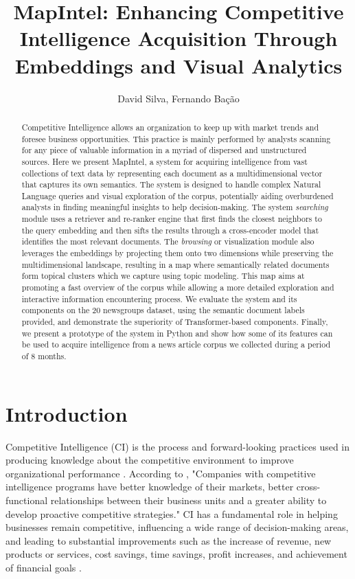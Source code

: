 \documentclass[a4paper]{article}
\title{MapIntel: Enhancing Competitive Intelligence Acquisition Through Embeddings and Visual Analytics}
\author{David Silva, Fernando Bação}
\date{}
\begin{document}
 
\maketitle

\begin{abstract}
Competitive Intelligence allows an organization to keep up with market trends and foresee business opportunities. This practice is mainly performed by analysts scanning for any piece of valuable information in a myriad of dispersed and unstructured sources. Here we present MapIntel, a system for acquiring intelligence from vast collections of text data by representing each document as a multidimensional vector that captures its own semantics. The system is designed to handle complex Natural Language queries and visual exploration of the corpus, potentially aiding overburdened analysts in finding meaningful insights to help decision-making. The system \emph{searching} module uses a retriever and re-ranker engine that first finds the closest neighbors to the query embedding and then sifts the results through a cross-encoder model that identifies the most relevant documents. The \emph{browsing} or visualization module also leverages the embeddings by projecting them onto two dimensions while preserving the multidimensional landscape, resulting in a map where semantically related documents form topical clusters which we capture using topic modeling. This map aims at promoting a fast overview of the corpus while allowing a more detailed exploration and interactive information encountering process. We evaluate the system and its components on the 20 newsgroups dataset, using the semantic document labels provided, and demonstrate the superiority of Transformer-based components. Finally, we present a prototype of the system in Python and show how some of its features can be used to acquire intelligence from a news article corpus we collected during a period of 8 months.
\end{abstract}

\section{Introduction}
Competitive Intelligence (CI) is the process and forward-looking practices used in producing knowledge about the competitive environment to improve organizational performance \citep{madureira2021}. According to \citet{brod1999}, "Companies with competitive intelligence programs have better knowledge of their markets, better cross-functional relationships between their business units and a greater ability to develop proactive competitive strategies." CI has a fundamental role in helping businesses remain competitive, influencing a wide range of decision-making areas, and leading to substantial improvements such as the increase of revenue, new products or services, cost savings, time savings, profit increases, and achievement of financial goals \citep{calof2017}.
\end{document}
